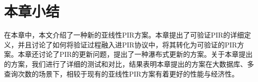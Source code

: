 \section{本章小结}

在本章中，本文介绍了一种新的亚线性PIR方案。本章提出了可验证PIR的详细定义，并且讨论了如何将验证过程融入进PIR协议中，将其转化为可验证的PIR方案。本章还讨论了PIR的更新问题，提出了一种瀑布式更新的方案。关于本章提出的方案，我们进行了详细的测试和对比，结果表明本章提出的方案在大数据库、多查询次数的场景下，相较于现有的亚线性PIR方案有着更好的性能与经济性。